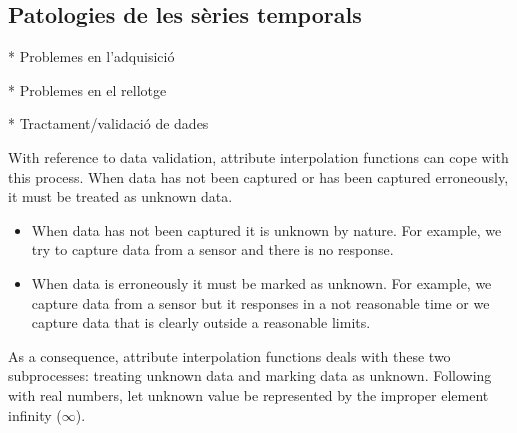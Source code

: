 \subsection{Patologies de les sèries temporals}

* Problemes en l'adquisició

* Problemes en el rellotge



* Tractament/validació de dades

With reference to data validation, attribute interpolation functions
can cope with this process. When data has not been captured or has
been captured erroneously, it must be treated as unknown data.
\begin{itemize}
\item When data has not been captured it is unknown by nature. For
  example, we try to capture data from a sensor and there is no
  response.
\item When data is erroneously it must be marked as unknown. For
  example, we capture data from a sensor but it responses in a not
  reasonable time or we capture data that is clearly outside a
  reasonable limits.
\end{itemize}
As a consequence, attribute interpolation functions deals with these
two subprocesses: treating unknown data and marking data as
unknown. Following with real numbers, let unknown value be represented
by the improper element infinity ($\infty$).  












